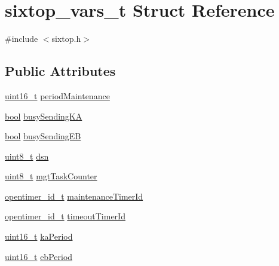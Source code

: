\hypertarget{structsixtop__vars__t}{}\section{sixtop\+\_\+vars\+\_\+t Struct Reference}
\label{structsixtop__vars__t}


{\ttfamily \#include $<$sixtop.\+h$>$}

\subsection*{Public Attributes}
\begin{DoxyCompactItemize}
\item 
\hyperlink{_p_e___types_8h_a1f1825b69244eb3ad2c7165ddc99c956}{uint16\+\_\+t} \hyperlink{structsixtop__vars__t_a3a396420e34f005e5dc090eecd472b38}{period\+Maintenance}
\item 
\hyperlink{_p_e___types_8h_a97a80ca1602ebf2303258971a2c938e2}{bool} \hyperlink{structsixtop__vars__t_a848f6f1946d0ab3969948b5e6a0f8c70}{busy\+Sending\+KA}
\item 
\hyperlink{_p_e___types_8h_a97a80ca1602ebf2303258971a2c938e2}{bool} \hyperlink{structsixtop__vars__t_a9c5af0aac4beea641117458a3fd21297}{busy\+Sending\+EB}
\item 
\hyperlink{_p_e___types_8h_aba7bc1797add20fe3efdf37ced1182c5}{uint8\+\_\+t} \hyperlink{structsixtop__vars__t_a8ec04a563fee368f44945c6e5a471e84}{dsn}
\item 
\hyperlink{_p_e___types_8h_aba7bc1797add20fe3efdf37ced1182c5}{uint8\+\_\+t} \hyperlink{structsixtop__vars__t_a1bdccc86dfaddebb020249a562a7cc11}{mgt\+Task\+Counter}
\item 
\hyperlink{group___open_timers_gae5ca9e65d270cdfa4bc74008d96d69ab}{opentimer\+\_\+id\+\_\+t} \hyperlink{structsixtop__vars__t_ae21082b5c336035692ac393c4c72a6c3}{maintenance\+Timer\+Id}
\item 
\hyperlink{group___open_timers_gae5ca9e65d270cdfa4bc74008d96d69ab}{opentimer\+\_\+id\+\_\+t} \hyperlink{structsixtop__vars__t_abe88209424f8d64be43f41fb8a52e16f}{timeout\+Timer\+Id}
\item 
\hyperlink{_p_e___types_8h_a1f1825b69244eb3ad2c7165ddc99c956}{uint16\+\_\+t} \hyperlink{structsixtop__vars__t_a6138c379d72fea5a66b410beee9397af}{ka\+Period}
\item 
\hyperlink{_p_e___types_8h_a1f1825b69244eb3ad2c7165ddc99c956}{uint16\+\_\+t} \hyperlink{structsixtop__vars__t_a7c8eb011492720422b1ad3e829d9d92c}{eb\+Period}

\end{DoxyCompactItemize}
